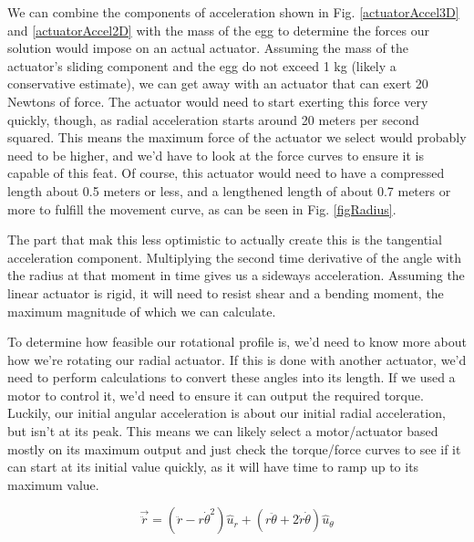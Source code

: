 \documentclass[nofoot,pdf-a,balance,colorlinks,upint,subscriptcorrection,varvw,mathalfa=cal=boondoxo]{asmeconf}
\begin{document}
        We can combine the components of acceleration shown in Fig. \ref{actuatorAccel3D} and \ref{actuatorAccel2D} with the mass of the egg to determine the forces our solution would impose on an actual actuator. Assuming the mass of the actuator's sliding component and the egg do not exceed 1 kg (likely a conservative estimate), we can get away with an actuator that can exert 20 Newtons of force. The actuator would need to start exerting this force very quickly, though, as radial acceleration starts around 20 meters per second squared. This means the maximum force of the actuator we select would probably need to be higher, and we'd have to look at the force curves to ensure it is capable of this feat. Of course, this actuator would need to have a compressed length about 0.5 meters or less, and a lengthened length of about 0.7 meters or more to fulfill the movement curve, as can be seen in Fig. \ref{figRadius}.

        The part that mak this less optimistic to actually create this is the tangential acceleration component. Multiplying the second time derivative of the angle with the radius at that moment in time gives us a sideways acceleration. Assuming the linear actuator is rigid, it will need to resist shear and a bending moment, the maximum magnitude of which we can calculate.

        To determine how feasible our rotational profile is, we'd need to know more about how we're rotating our radial actuator. If this is done with another actuator, we'd need to perform calculations to convert these angles into its length. If we used a motor to control it, we'd need to ensure it can output the required torque. Luckily, our initial angular acceleration is about our initial radial acceleration, but isn't at its peak. This means we can likely select a motor/actuator based mostly on its maximum output and just check the torque/force curves to see if it can start at its initial value quickly, as it will have time to ramp up to its maximum value.

        \begin{equation} 
            \vec{\ddot{r}} = \left(\ddot{r} - r{\dot{\theta}}^2\right)\hat{u}_r + \left(r\ddot{\theta} + 2\dot{r}\dot{\theta}\right)\hat{u}_{\theta}
        \end{equation}
\end{document}
